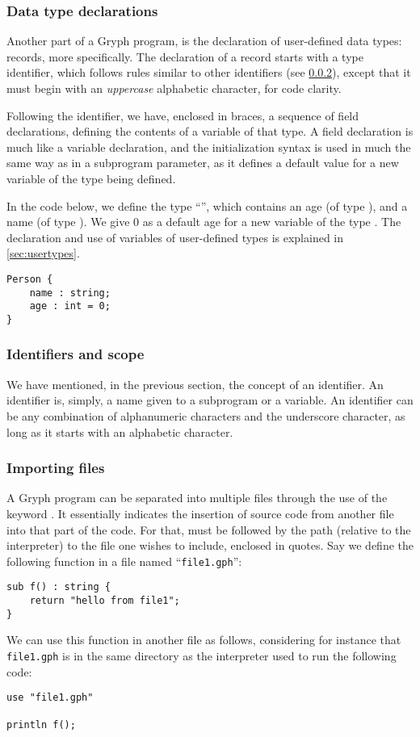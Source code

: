 \subsubsection{Data type declarations}
\label{sec:typedecl}
Another part of a Gryph program, is the declaration of user-defined data types: records, more specifically. The declaration of a record starts with a type identifier, which follows rules similar to other identifiers (see \ref{sec:idsandscope}), except that it must begin with an \emph{uppercase} alphabetic character, for code clarity. 

Following the identifier, we have, enclosed in braces, a sequence of field declarations, defining the contents of a variable of that type. A field declaration is much like a variable declaration, and the initialization syntax is used in much the same way as in a subprogram parameter, as it defines a default value for a new variable of the type being defined.

In the code below, we define the type ``'', which contains an age (of type ), and a name (of type ). We give 0 as a default age for a new variable of the type . The declaration and use of variables of user-defined types is explained in \ref{sec:usertypes}.
\begin{lstlisting}[language=Gryph]
Person {
	name : string;
	age : int = 0;
}
\end{lstlisting}

\subsubsection{Identifiers and scope}
\label{sec:idsandscope}
We have mentioned, in the previous section, the concept of an identifier. An identifier is, simply, a name given to a subprogram or a variable. An identifier can be any combination of alphanumeric characters and the underscore character, as long as it starts with an alphabetic character.

\subsubsection{Importing files}
A Gryph program can be separated into multiple files through the use of the keyword . It essentially indicates the insertion of source code from another file into that part of the code. For that,  must be followed by the path (relative to the interpreter) to the file one wishes to include, enclosed in quotes. Say we define the following function in a file named ``\texttt{file1.gph}'':
\begin{lstlisting}[language=Gryph]
sub f() : string {
	return "hello from file1";
}
\end{lstlisting}
We can use this function in another file as follows, considering for instance that \texttt{file1.gph} is in the same directory as the interpreter used to run the following code:
\begin{lstlisting}[language=Gryph]
use "file1.gph"

println f();
\end{lstlisting}

